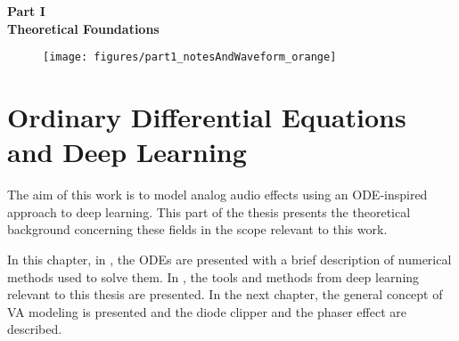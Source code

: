 \cleardoublepage
\thispagestyle{empty}
\begin{center}
\vspace*{3cm}
{\huge \bf Part I}\\ \vspace*{1cm}
{\Huge \bf Theoretical Foundations}\\\vspace*{0.2cm}
\begin{figure}[ht]
\centering
\texttt{[image: figures/part1\_notesAndWaveform\_orange]}
\end{figure}
\end{center}
\label{par:part1}
\newpage
\quad
\thispagestyle{empty}
\newpage



\chapter{Ordinary Differential Equations and Deep Learning}
\label{chapter:odes_and_dl}

The aim of this work is to model analog audio effects using an \ac{ODE}-inspired approach to deep learning. This part of the thesis presents the theoretical background concerning these fields in the scope relevant to this work. 

In this chapter, in , the \acp{ODE} are presented with a brief description of numerical methods used to solve them. In , the tools and methods from deep learning relevant to this thesis are presented. In the next chapter, the general concept of \ac{VA} modeling is presented and the diode clipper and the phaser effect are described.



